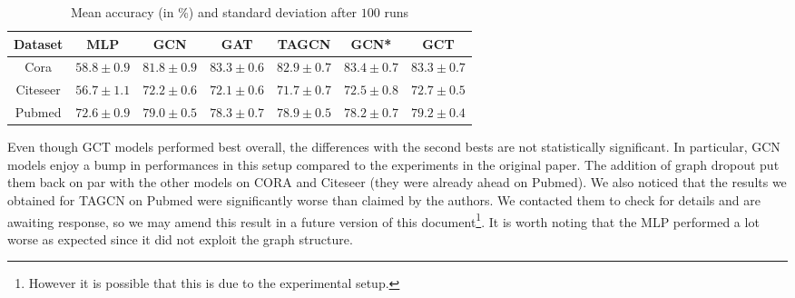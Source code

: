 \begin{table}[H]
\begin{center}
  \bgroup
  \def\arraystretch{1.5}%
  \begin{tabular}{|c|c|c|c|c|c|c|}
    \hline
    Dataset & MLP & GCN & GAT & TAGCN & GCN* & GCT\\
    \hline
    \hline
    Cora & $58.8 \pm 0.9$ & $81.8 \pm 0.9$ & $83.3 \pm 0.6$ & $82.9 \pm 0.7$ & $\mathbf{83.4} \pm 0.7$ & $83.3 \pm 0.7$\\
    \hline
    Citeseer & $56.7 \pm 1.1$ & $72.2 \pm 0.6$ & $72.1 \pm 0.6$ & $71.7 \pm 0.7$ & $72.5 \pm 0.8$ & $\mathbf{72.7} \pm 0.5$\\
    \hline
    Pubmed & $72.6 \pm 0.9$ & $79.0 \pm 0.5$ & $78.3 \pm 0.7$ & $78.9 \pm 0.5$ & $78.2 \pm 0.7$ & $\mathbf{79.2} \pm 0.4$\\
    \hline
  \end{tabular}
  \egroup
\end{center}
\caption{Mean accuracy (in \%) and standard deviation after $100$ runs}
\label{tab:lss}
\end{table}

Even though GCT models performed best overall, the differences with the second bests are not statistically significant. In particular, GCN models enjoy a bump in performances in this setup compared to the experiments in the original paper. The addition of graph dropout put them back on par with the other models on CORA and Citeseer (they were already ahead on Pubmed). We also noticed that the results we obtained for TAGCN on Pubmed were significantly worse than claimed by the authors. We contacted them to check for details and are awaiting response, so we may amend this result in a future version of this document\footnote{However it is possible that this is due to the experimental setup.}. It is worth noting that the MLP performed a lot worse as expected since it did not exploit the graph structure.